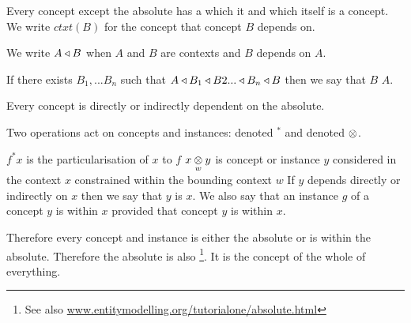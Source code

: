\documentclass[10pt,a4paper]{article}
\begin{document}
\mynote
Every concept except the absolute has a  which it  and which itself is a concept. 
We write $ctxt(B)$
for the  concept that concept $B$ depends on.

We write $A \base B$  when  $A$ and $B$ are contexts and $B$ depends on $A$.

\mynote
If there exists $B_1,...B_n$ such that
$A \base B_1 \base B2 ... \base B_n \base B$ then we say that $B$  $A$.

\mynote Every concept is directly or indirectly dependent on the absolute.

\mynote
Two operations act on concepts and instances:  denoted
$^*$ and   denoted $\cross$.

\mynote
$f^*x$ is the particularisation of $x$ to $f$
\mynote
$\crossx{x}{y}{w}$ is concept or instance $y$ considered in the context $x$ constrained within the bounding context $w$
\mynote
If $y$ depends directly or indirectly on $x$ then we say that $y$ is  $x$.
We also say that an instance $g$ of a concept $y$ is within $x$ provided that concept $y$ is within $x$.

\mynote 
Therefore every concept and instance is either the absolute or is within the absolute.
Therefore the absolute  is also \footnote{See also \url{www.entitymodelling.org/tutorialone/absolute.html}}. It is the concept of the whole of everything.
\end{document}
